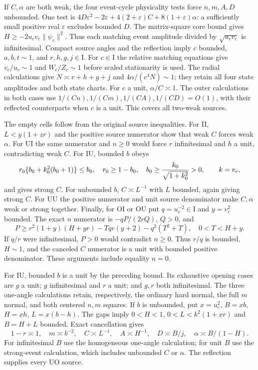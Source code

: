 If $C,\alpha$ are both weak, the four event-cycle physicality tests
force $n,m,A,D$ unbounded. One test is
$4D\varepsilon^2-2\varepsilon+4(2+\varepsilon)C
+8(1+\varepsilon)\alpha$: a sufficiently small positive real
$\varepsilon$ excludes bounded $D$. The matrix-square core bound gives
$H\ge-2u_cv_c\|\psi_c\|^2$. Thus each matching event amplitude divided
by $\sqrt{u_cv_c}$ is infinitesimal. Compact source angles and the
reflection imply $c$ bounded, $a,b,t\sim1$, and
$r,h,g,j\in\mathrm I$. For $c\in\mathrm I$ the relative matching
equations give $v_c/u_c\sim1$ and $W_c/Z_c\sim1$ before scaled
stationarity is used. The radial calculations give
$N\asymp r+h+g+j$ and $4\alpha/(c^4N)\sim1$; they retain all four
state amplitudes and both state charts. For $c$ a unit,
$\alpha/C\asymp1$. The outer calculations in both cases use
$1/(Cn),1/(Cm),1/(CA),1/(CD)=O(1)$, with their reflected counterparts
when $c$ is a unit. This covers all two-weak sources.

The empty cells follow from the original source inequalities.
For II, $L<y(1+zr)$ and the positive source numerator show that weak
$C$ forces weak $\alpha$. For UI the same numerator and $n\ge0$
would force $r$ infinitesimal and $h$ a unit, contradicting weak $C$.
For IU, bounded $b$ obeys
\[
 r_0\{b_0+k_0^2(b_0+1)\}\le b_0,\quad
 r_0\ge1-b_0,\quad b_0\ge{k_0\over\sqrt{1+k_0^2}}>0,
 \qquad k=v_c,
\]
and gives strong $C$. For unbounded $b$, $C\asymp L^{-1}$ with
$L$ bounded, again giving strong $C$. For UU the positive numerator
and unit source denominator make $C,\alpha$ weak or strong together.
Finally, for OI or OU put $q=u_c^{-2}\in\mathrm I$ and $y=v_c^2$
bounded. The exact $n$ numerator is $-qP/(2rQ)$, $Q>0$, and
\[
 P\ge r^2(1+y)(H+yr)-Tqr(y+2)-q^2(T^2+T),\quad0<T<H+y.
\]
If $q/r$ were infinitesimal, $P>0$ would contradict $n\ge0$.
Thus $r/q$ is bounded, $H\sim1$, and the canceled $C$ numerator
is a unit with bounded positive denominator. These arguments include
equality $n=0$.

For IU, bounded $b$ is a unit by the preceding bound. Its exhaustive
opening cases are $g$ a unit; $g$ infinitesimal and $r$ a unit; and
$g,r$ both infinitesimal. The three one-angle calculations retain,
respectively, the ordinary hard normal, the full $m$ normal, and both
centered $n,m$ squares. If $b$ is unbounded, put
$x=u_c^2$, $B=xb$, $H=xh$, $L=x(b-h)$. The gaps imply
$0<H<1$, $0<L<k^2(1+xr)$ and $B=H+L$ bounded. Exact cancellation gives
\[
 1-r\asymp1,\quad m\asymp b^{-2},\quad C\asymp L^{-1},
 \quad A\asymp H^{-1},\quad D\asymp B/j,\quad
 \alpha\asymp B/(1-H).
\]
For infinitesimal $B$ use the homogeneous one-angle calculation; for
unit $B$ use the strong-event calculation, which includes unbounded
$C$ or $\alpha$. The reflection supplies every UO source.

